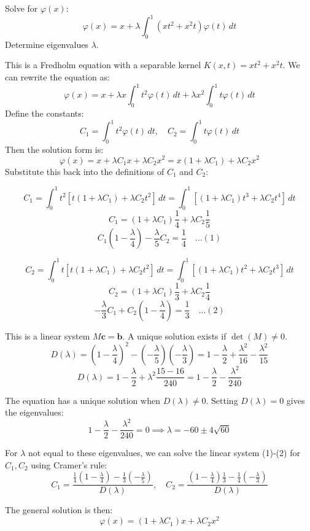 \documentclass[a4paper,11pt]{article} %
\begin{document}
\begin{problembox}
Solve for $\varphi(x)$:
$$\varphi(x) = x + \lambda \int_0^1 (x t^2 + x^2 t) \varphi(t) \, dt$$
Determine eigenvalues $\lambda$.
\end{problembox}

This is a Fredholm equation with a separable kernel $K(x,t) = x t^2 + x^2 t$.
We can rewrite the equation as:
$$ \varphi(x) = x + \lambda x \int_0^1 t^2 \varphi(t) \, dt + \lambda x^2 \int_0^1 t \varphi(t) \, dt $$
Define the constants:
$$ C_1 = \int_0^1 t^2 \varphi(t) \, dt, \quad C_2 = \int_0^1 t \varphi(t) \, dt $$
Then the solution form is:
$$ \varphi(x) = x + \lambda C_1 x + \lambda C_2 x^2 = x(1+\lambda C_1) + \lambda C_2 x^2 $$
Substitute this back into the definitions of $C_1$ and $C_2$:

$$ C_1 = \int_0^1 t^2 [t(1+\lambda C_1) + \lambda C_2 t^2] \, dt = \int_0^1 [(1+\lambda C_1)t^3 + \lambda C_2 t^4] \, dt $$
$$ C_1 = (1+\lambda C_1)\frac{1}{4} + \lambda C_2 \frac{1}{5} $$
$$ C_1 \left(1 - \frac{\lambda}{4}\right) - \frac{\lambda}{5}C_2 = \frac{1}{4} \quad \dots (1) $$

$$ C_2 = \int_0^1 t [t(1+\lambda C_1) + \lambda C_2 t^2] \, dt = \int_0^1 [(1+\lambda C_1)t^2 + \lambda C_2 t^3] \, dt $$
$$ C_2 = (1+\lambda C_1)\frac{1}{3} + \lambda C_2 \frac{1}{4} $$
$$ - \frac{\lambda}{3}C_1 + C_2 \left(1 - \frac{\lambda}{4}\right) = \frac{1}{3} \quad \dots (2) $$

This is a linear system $M \mathbf{c} = \mathbf{b}$. A unique solution exists if $\det(M) \neq 0$.
$$ D(\lambda) = \left(1 - \frac{\lambda}{4}\right)^2 - \left(-\frac{\lambda}{5}\right)\left(-\frac{\lambda}{3}\right) = 1 - \frac{\lambda}{2} + \frac{\lambda^2}{16} - \frac{\lambda^2}{15} $$
$$ D(\lambda) = 1 - \frac{\lambda}{2} + \lambda^2 \frac{15-16}{240} = 1 - \frac{\lambda}{2} - \frac{\lambda^2}{240} $$

The equation has a unique solution when $D(\lambda) \neq 0$. Setting $D(\lambda) = 0$ gives the eigenvalues:
$$ 1 - \frac{\lambda}{2} - \frac{\lambda^2}{240} = 0 \implies \lambda = -60 \pm 4\sqrt{60}$$


For $\lambda$ not equal to these eigenvalues, we can solve the linear system (1)-(2) for $C_1, C_2$ using Cramer's rule:
$$ C_1 = \frac{\frac{1}{4}(1-\frac{\lambda}{4}) - \frac{1}{3}(-\frac{\lambda}{5})}{D(\lambda)}, \quad C_2 = \frac{(1-\frac{\lambda}{4})\frac{1}{3} - \frac{1}{4}(-\frac{\lambda}{3})}{D(\lambda)} $$

The general solution is then:
$$ \varphi(x) = (1+\lambda C_1)x + \lambda C_2 x^2 $$
\end{document}
